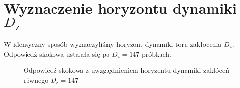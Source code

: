 \section{Wyznaczenie horyzontu dynamiki $D_{\mathrm{z}}$}
\label{zad3_wyznacznie_Dz}
W identyczny sposób wyznaczyliśmy horyzont dynamiki toru zakłocenia $D_{\mathrm{z}}$. 
Odpowiedź skokowa ustalała się po $D_{\mathrm{z}} = \num{147}$ próbkach.

\begin{figure}[b]
    \centering
    \caption{Odpowiedź skokowa z uwzględnieniem horyzontu dynamiki zakłóceń równego $D_{\mathrm{z}} = 147$}
    \label{zad3_cut_resp}
\end{figure}